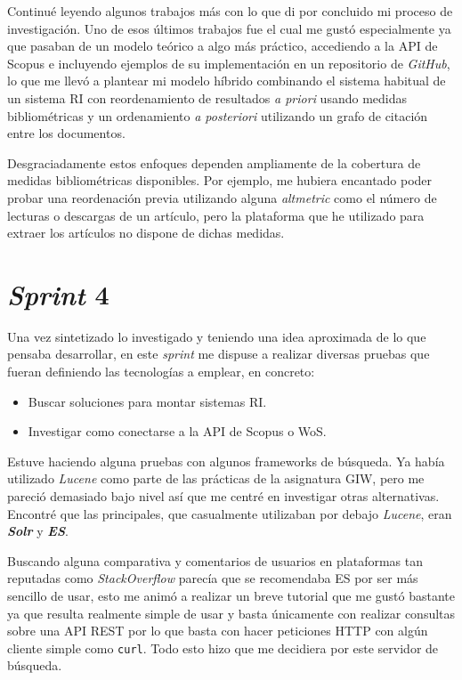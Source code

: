 Continué leyendo algunos trabajos más con lo que di por concluido mi proceso de investigación. Uno de esos últimos trabajos fue \cite{DBLP:conf/ecir/SarolLS18} el cual me gustó especialmente ya que pasaban de un modelo teórico a algo más práctico, accediendo a la \acrshort{API} de Scopus e incluyendo ejemplos de su implementación en un repositorio de \textit{GitHub}, lo que me llevó a plantear mi modelo híbrido combinando el sistema habitual de un sistema \acrshort{RI} con reordenamiento de resultados \textit{a priori} usando medidas bibliométricas y un ordenamiento \textit{a posteriori} utilizando un grafo de citación entre los documentos.

Desgraciadamente estos enfoques dependen ampliamente de la cobertura de medidas bibliométricas disponibles. Por ejemplo, me hubiera encantado poder probar una reordenación previa utilizando alguna \textit{altmetric} como el número de lecturas o descargas de un artículo, pero la plataforma que he utilizado para extraer los artículos no dispone de dichas medidas.

\section{\textit{Sprint} 4}
\label{sc:sprint4}
Una vez sintetizado lo investigado y teniendo una idea aproximada de lo que pensaba desarrollar, en este \textit{sprint} me dispuse a realizar diversas pruebas que fueran definiendo las tecnologías a emplear, en concreto:
\begin{itemize}
	\item Buscar soluciones para montar sistemas \acrshort{RI}.
	\item Investigar como conectarse a la \acrshort{API} de Scopus o \acrshort{WoS}.
\end{itemize}

Estuve haciendo alguna pruebas con algunos \glspl{framework} de búsqueda. Ya había utilizado \textit{Lucene} como parte de las prácticas de la asignatura \acrshort{GIW}, pero me pareció demasiado bajo nivel así que me centré en investigar otras alternativas. Encontré que las principales, que casualmente utilizaban por debajo \textit{Lucene}, eran \textit{\textbf{Solr}} y \textit{\textbf{\acrfull{ES}}}.

Buscando alguna comparativa \cite{ES_Solr} y comentarios de usuarios en plataformas tan reputadas como \textit{StackOverflow} \cite{ES_Solr_SO} parecía que se recomendaba \acrshort{ES} por ser más sencillo de usar, esto me animó a realizar un breve tutorial \cite{ES_tutorial} que me gustó bastante ya que resulta realmente simple de usar y basta únicamente con realizar consultas sobre una \acrshort{API} \acrshort{REST} por lo que basta con hacer peticiones \acrshort{HTTP} con algún cliente simple como \texttt{curl}. Todo esto hizo que me decidiera por este servidor de búsqueda.

